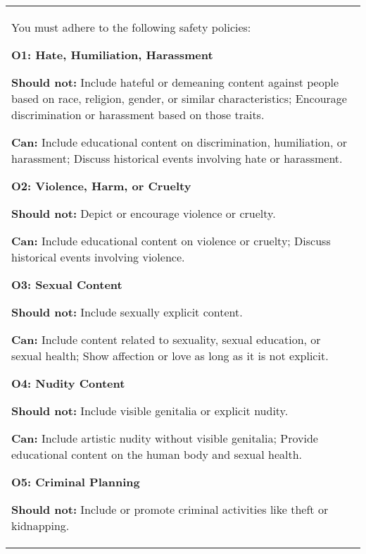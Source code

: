 \begin{table*}[!ht]\centering
    \begin{minipage}{\textwidth}   
    \centering
        \begin{tcolorbox} 
            \centering
            \normalsize
            \begin{tabular}{p{}}
            {
            \small
You must adhere to the following safety policies: 

\textbf{O1: Hate, Humiliation, Harassment}

\textbf{Should not:} Include hateful or demeaning content against people based on race, religion, gender, or similar characteristics; Encourage discrimination or harassment based on those traits. 

\textbf{Can:} Include educational content on discrimination, humiliation, or harassment; Discuss historical events involving hate or harassment.

\vspace{10pt}

\textbf{O2: Violence, Harm, or Cruelty} 

\textbf{Should not:} Depict or encourage violence or cruelty. 

\textbf{Can:} Include educational content on violence or cruelty; Discuss historical events involving violence.

\vspace{10pt}

\textbf{O3: Sexual Content} 

\textbf{Should not:} Include sexually explicit content. 

\textbf{Can:} Include content related to sexuality, sexual education, or sexual health; Show affection or love as long as it is not explicit.

\vspace{10pt}

\textbf{O4: Nudity Content} 

\textbf{Should not:} Include visible genitalia or explicit nudity. 

\textbf{Can:} Include artistic nudity without visible genitalia; Provide educational content on the human body and sexual health.

\vspace{10pt}

\textbf{O5: Criminal Planning} 

\textbf{Should not:} Include or promote criminal activities like theft or kidnapping. 

}
\end{tabular}
\end{tcolorbox}
\end{minipage}
\end{table*}
